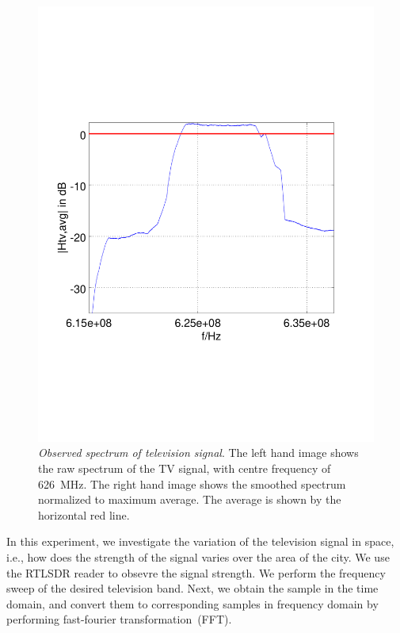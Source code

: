 \begin{figure}[h]
\begin{minipage}{0.49\columnwidth}
	\includegraphics[width=\columnwidth]{./fig/626mhz_filtered}
	\end{minipage}
	\vspace{-6mm}
	\caption{\emph{Observed spectrum of television signal}. The left hand image shows the raw spectrum of the TV signal, with centre frequency of \SI{626}{\mega\hertz}. The right hand image shows the smoothed spectrum normalized to maximum average. The average is  shown by the horizontal red line.}
	\label{fig:tv_record} 
		\vspace{-6mm}
\end{figure}

In this experiment, we investigate the variation of the television signal
in space, i.e., how does the strength of the signal varies over 
the area of the city. We use the RTLSDR reader to obsevre the signal strength.
We perform the frequency sweep of the desired television band. Next, we
obtain the sample in the time domain, and convert them to corresponding
samples in frequency domain by performing fast-fourier transformation~(FFT).

